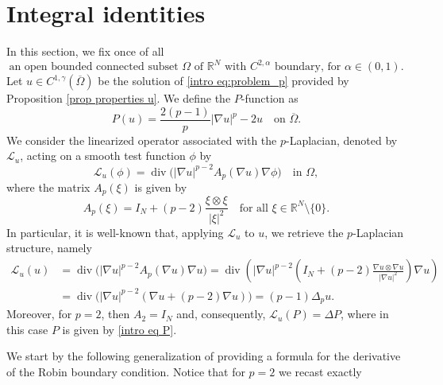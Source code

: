 \documentclass[10pt,a4paper, reqno]{amsart}
\numberwithin{equation}{section}
\newcommand{\R}{\mathbb{R}}
\renewcommand{\div}{\operatorname{div}}
\begin{document}
\section{Integral identities}\label{sec: integral identities}
In this section, we fix once of all 
\[
\text{an open bounded connected subset $\Omega$ of } \R^N \text{ with } C^{2,\alpha} \text{ boundary, for } \alpha \in (0,1).
\]
Let $u \in C^{1,\gamma}(\overline{\Omega})$ be the solution of \eqref{intro eq:problem_p} provided by Proposition \ref{prop properties u}. We define the $P$-function as
\begin{equation}\label{eq:P_function}
    P(u) = \frac{2(p-1)}{p}|\nabla u|^p - 2u \quad \text{on } \overline{\Omega}.
\end{equation}
We consider the linearized operator associated with the $p$-Laplacian, denoted by $\mathcal{L}_u$, acting on a smooth test function $\phi$ by
\begin{equation}\label{eq: L(phi)_function}
    \mathcal{L}_u(\phi) = \div\big( |\nabla u|^{p-2} A_p(\nabla u) \nabla \phi \big) \quad \text{in } \Omega,
\end{equation}
where the matrix $A_p(\xi)$ is given by
\begin{equation}\label{eq:matrix_A}
    A_p(\xi) = I_N + (p-2)\frac{\xi \otimes \xi}{|\xi|^2} \quad \text{for all } \xi \in \R^N \setminus \{0\}.
\end{equation}
In particular, it is well-known that, applying $\mathcal{L}_u$ to $u$, we retrieve the $p$-Laplacian structure, namely
\begin{equation}\label{eq: L(u)_u}
\begin{aligned}
    \mathcal{L}_u(u) &= \div\big( |\nabla u|^{p-2} A_p(\nabla u) \nabla u \big) = \div\left( |\nabla u|^{p-2} \left( I_N + (p-2)\frac{\nabla u \otimes \nabla u}{|\nabla u|^2} \right) \nabla u \right) \\
    &= \div\big( |\nabla u|^{p-2} ( \nabla u + (p-2)\nabla u ) \big) = (p-1)\Delta_p u.
\end{aligned}
\end{equation}
Moreover, for $p=2$, then $A_2 = I_N$ and, consequently, $\mathcal{L}_u(P) = \Delta P$, where in this case $P$ is given by \eqref{intro eq P}.                  

We start by the following generalization of \cite[Lemma 1]{gamo26} providing a formula for the derivative of the Robin boundary condition. Notice that for $p=2$ we recast exactly \cite[Eq.\,(3.1)]{gamo26}
\end{document}
